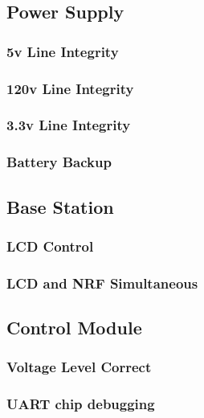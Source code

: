 \tbw

\subsection{Power Supply}

\subsubsection{5v Line Integrity}

\subsubsection{120v Line Integrity}

\subsubsection{3.3v Line Integrity}

\subsubsection{Battery Backup}

\subsection{Base Station}

\subsubsection{LCD Control}

\subsubsection{LCD and NRF Simultaneous}

\subsection{Control Module}

\subsubsection{Voltage Level Correct}

\subsubsection{UART chip debugging}

